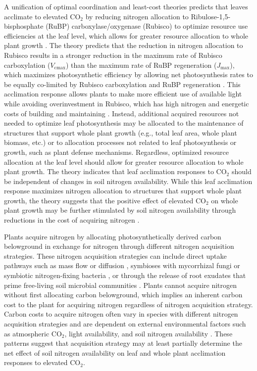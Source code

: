 A unification of optimal coordination and least-cost theories predicts that leaves acclimate to elevated CO$_2$ by reducing nitrogen allocation to Ribulose-1,5-bisphosphate (RuBP) carboxylase/oxygenase (Rubisco) to optimize resource use efficiencies at the leaf level, which allows for greater resource allocation to whole plant growth . The theory predicts that the reduction in nitrogen allocation to Rubisco results in a stronger reduction in the maximum rate of Rubisco carboxylation ($V_\mathrm{cmax}$) than the maximum rate of RuBP regeneration ($J_\mathrm{max}$), which maximizes photosynthetic efficiency by allowing net photosynthesis rates to be equally co-limited by Rubisco carboxylation and RuBP regeneration . This acclimation response allows plants to make more efficient use of available light while avoiding overinvestment in Rubisco, which has high nitrogen and energetic costs of building and maintaining . Instead, additional acquired resources not needed to optimize leaf photosynthesis may be allocated to the maintenance of structures that support whole plant growth (e.g., total leaf area, whole plant biomass, etc.) or to allocation processes not related to leaf photosynthesis or growth, such as plant defense mechanisms. Regardless, optimized resource allocation at the leaf level should allow for greater resource allocation to whole plant growth. The theory indicates that leaf acclimation responses to CO$_2$ should be independent of changes in soil nitrogen availability. While this leaf acclimation response maximizes nitrogen allocation to structures that support whole plant growth, the theory suggests that the positive effect of elevated CO$_2$ on whole plant growth may be further stimulated by soil nitrogen availability through reductions in the cost of acquiring nitrogen .

Plants acquire nitrogen by allocating photosynthetically derived carbon belowground in exchange for nitrogen through different nitrogen acquisition strategies. These nitrogen acquisition strategies can include direct uptake pathways such as mass flow or diffusion , symbioses with mycorrhizal fungi or symbiotic nitrogen-fixing bacteria , or through the release of root exudates that prime free-living soil microbial communities . Plants cannot acquire nitrogen without first allocating carbon belowground, which implies an inherent carbon cost to the plant for acquiring nitrogen regardless of nitrogen acquisition strategy. Carbon costs to acquire nitrogen often vary in species with different nitrogen acquisition strategies and are dependent on external environmental factors such as atmospheric CO$_2$, light availability, and soil nitrogen availability . These patterns suggest that acquisition strategy may at least partially determine the net effect of soil nitrogen availability on leaf and whole plant acclimation responses to elevated CO$_2$.

